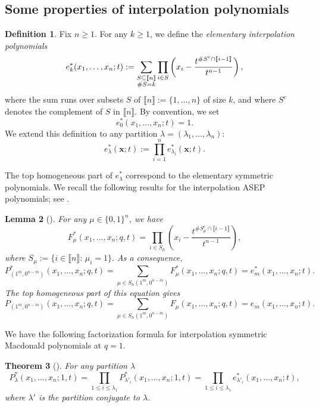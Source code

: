 \documentclass[12pt]{amsart}
\newtheorem{thm}{Theorem}[section]
\newtheorem{lem}[thm]{Lemma}
\theoremstyle{definition}
\newtheorem{definition}[thm]{Definition}
\newcommand{\bfx}{\boldsymbol{x}}
\begin{document}
\subsection{Some properties of interpolation polynomials}
\begin{definition}\label{def:int_elem}
Fix $n\geq 1$. For any $k\geq 1$, we define the \emph{elementary interpolation polynomials}
$$e^*_{k}(x_1,\dots,x_n;t):=\sum_{\begin{subarray}{c}S\subseteq \llbracket n \rrbracket\\  \#S=k\end{subarray}}\prod_{i\in S}\left(x_i-\frac{t^{\#S^c\cap \llbracket i-1\rrbracket}}{t^{n-1}}\right),$$
where the sum runs over subsets $S$ of $\llbracket n\rrbracket:=\{1,\dots, n\}$ of size $k$, and where $S^c$ denotes the complement of $S$ in $\llbracket n\rrbracket$. By convention, we set
$$e_0^*(x_1,\dots,x_n;t)=1.$$
We extend this definition to any partition $\lambda=(\lambda_1,\dots,\lambda_n)$:
$$e_\lambda^*(\bfx;t):=\prod_{i=1}^n e^*_{\lambda_i}(\bfx;t).$$
\end{definition}
The top homogeneous part of $e_{\lambda}^*$ correspond to the elementary symmetric polynomials.
We recall the following results for the interpolation ASEP polynomials; see \cite[Lemma 7.2]{BenDaliWilliams2025}.
\begin{lem}[\cite{{BenDaliWilliams2025}}]\label{lem:P_column}
        For any $\mu\in\{0,1\}^n$, we have
        \begin{equation}\label{eq:factorization_one_row}
          F_\mu^*(x_1,\dots,x_n;q,t)=\prod_{i\in S_\mu}\left(x_i-\frac{t^{\#S^c_\mu\cap \llbracket i-1\rrbracket}}{t^{n-1}}\right), \end{equation}
          where $S_\mu:=\{i\in \llbracket n\rrbracket: \, \mu_i=1\}.$
        As a consequence, 
    \begin{equation}\label{eq:P_column}
          P^*_{(1^m,0^{n-m})}(x_1,\dots,x_n;q,t)=\sum_{\mu\in S_n(1^m,0^{n-m})}F^*_{\mu}(x_1,\dots,x_n;q,t)=e^*_m(x_1,\dots,x_n;t).  
        \end{equation}
        The top homogeneous part of this equation gives
    \begin{equation}\label{eq:P_column_hom}
          P_{(1^m,0^{n-m})}(x_1,\dots,x_n;q,t)=\sum_{\mu\in S_n(1^m,0^{n-m})}F_{\mu}(x_1,\dots,x_n;q,t)=e_m(x_1,\dots,x_n;t).  
        \end{equation}
\end{lem}

We have the following factorization formula for interpolation symmetric Macdonald polynomials at $q=1$.
\begin{thm}[\cite{Dolega2017,BenDaliWilliams2025}]\label{thm:factorization_property}\label{thm:factorization}
For any partition $\lambda$
    \begin{equation}\label{eq:factorization}
      P^*_\lambda(x_1,\dots,x_n;1,t)=\prod_{1\leq i\leq \lambda_1}P^*_{\lambda'_i}(x_1,\dots,x_n;1,t)=\prod_{1\leq i\leq \lambda_1}e^*_{\lambda'_i}(x_1,\dots,x_n;t),
    \end{equation}
    where $\lambda'$ is the partition conjugate to $\lambda$.
\end{thm}
\end{document}
